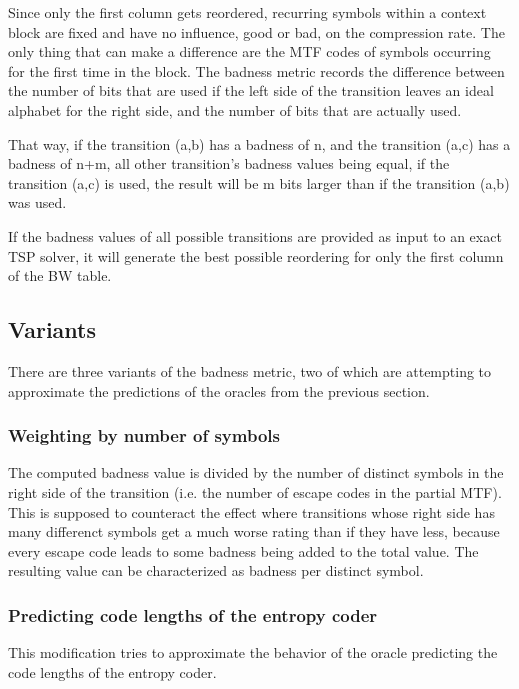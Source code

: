 \documentclass[a4paper]{scrreprt}
\begin{document}
Since only the first column gets reordered, recurring symbols within a
context block are fixed and have no influence, good or bad, on the compression
rate. The only thing that can make a difference are the MTF codes of symbols
occurring for the first time in the block. The badness metric records the
difference between the number of bits that are used if the left side of the
transition leaves an ideal alphabet for the right side, and the number of bits
that are actually used.

That way, if the transition (a,b) has a badness of n, and the transition (a,c)
has a badness of n+m, all other transition's badness values being equal, if the
transition (a,c) is used, the result will be m bits larger than if the
transition (a,b) was used.

If the badness values of all possible transitions are provided as input to an
exact TSP solver, it will generate the best possible reordering for only the
first column of the BW table.

\subsection{Variants}

There are three variants of the badness metric, two of which are attempting to
approximate the predictions of the oracles from the previous section.

\subsubsection{Weighting by number of symbols}

The computed badness value is divided by the number of distinct symbols in the
right side of the transition (i.e. the number of escape codes in the partial
MTF). This is supposed to counteract the effect where transitions whose right
side has many differenct symbols get a much worse rating than if they have less,
because every escape code leads to some badness being added to the total value.
The resulting value can be characterized as badness per distinct symbol.

\subsubsection{Predicting code lengths of the entropy coder}

This modification tries to approximate the behavior of the oracle predicting the
code lengths of the entropy coder.
\end{document}
